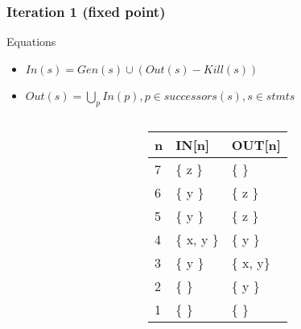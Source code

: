 \begin{frame}[fragile, t]
 \frametitle{Iteration 1 (fixed point)} 

\begin{center}
\begin{scriptsize}
\begin{minipage}{8cm}
    \begin{block}{Equations}
    \begin{itemize}
        \item $In(s) = Gen(s) \cup (Out(s) - Kill(s))$  
        \item $Out(s) = \bigcup_p In(p), p \in successors(s), s \in stmts$
    \end{itemize}
    \end{block}
\end{minipage}
\end{scriptsize}
\end{center}

\begin{columns}[T]
\begin{column}[T]{.5\textwidth}
    \vspace{0pt}
    
    \end{column}
    \begin{column}[T]{.5\textwidth}
\vspace{30pt}    
	\begin{scriptsize}
	   \begin{table}[]
\begin{tabular}{|l|l|l|}
\hline
n & IN{[}n{]} & OUT{[}n{]} \\ \hline
7  &   \{ z \}         &   \{ \}        \pause \\ \hline
6  &   \{ y \}        &     \{ z \}      \pause \\ \hline
5  &   \{ y \}        &    \{ z \}       \pause \\ \hline
4  &   \{ x, y \}        &   \{ y \}        \pause \\ \hline
3  &   \{ y \}        &  \{ x, y\}         \pause \\ \hline
2  &    \{  \}       &    \{ y \}       \pause \\ \hline
1  &   \{  \}          &   \{  \}          \pause \\ \hline
\end{tabular}
\end{table}   
	\end{scriptsize}
	\end{column}
    
\end{columns}


\end{frame}

